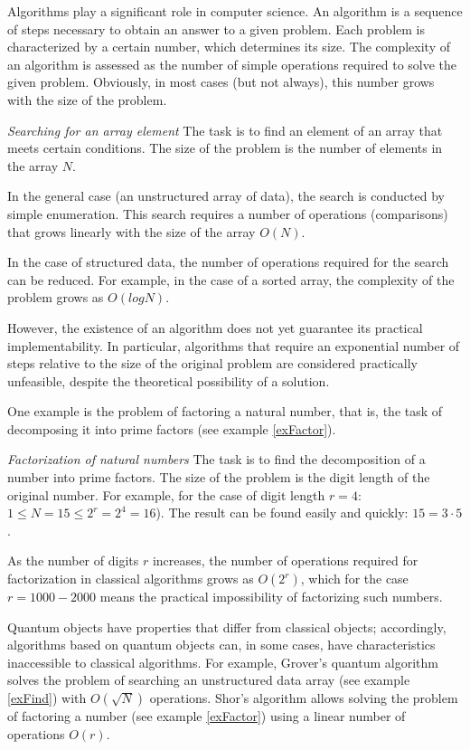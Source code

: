 Algorithms play a significant role in computer science. An algorithm is a sequence of steps necessary to obtain an answer to a given problem. Each problem is characterized by a certain number, which determines its size. The complexity of an algorithm is assessed as the number of simple operations required to solve the given problem. Obviously, in most cases (but not always), this number grows with the size of the problem.

\begin{example}
\emph{Searching for an array element}
\label{exFind}
The task is to find an element of an array that meets certain conditions. The size of the problem is the number of elements in the array $N$.

In the general case (an unstructured array of data), the search is conducted by simple enumeration. This search requires a number of operations (comparisons) that grows linearly with the size of the array $O\left( N \right)$.

In the case of structured data, the number of operations required for the search can be reduced. For example, in the case of a sorted array, the complexity of the problem grows as $O\left(log N\right)$.
\end{example}

However, the existence of an algorithm does not yet guarantee its practical implementability. In particular, algorithms that require an exponential number of steps relative to the size of the original problem are considered practically unfeasible, despite the theoretical possibility of a solution.

One example is the problem of factoring a natural number, that is, the task of decomposing it into prime factors (see example \ref{exFactor}).

\begin{example}
\emph{Factorization of natural numbers}
\label{exFactor}
The task is to find the decomposition of a number into prime factors. The size of the problem is the digit length of the original number. For example, for the case of digit length $r = 4$: $1 \le N = 15 \le 2^r = 2^4 = 16$). The result can be found easily and quickly: $15 = 3 \cdot 5$.

As the number of digits $r$ increases, the number of operations required for factorization in classical algorithms grows as $O\left(2^r\right)$, which for the case $r = 1000 - 2000$ means the practical impossibility of factorizing such numbers.
\end{example}

Quantum objects have properties that differ from classical objects; accordingly, algorithms based on quantum objects can, in some cases, have characteristics inaccessible to classical algorithms. For example, Grover's quantum algorithm \cite{Grover96afast} solves the problem of searching an unstructured data array (see example \ref{exFind}) with $O\left(\sqrt{N}\right)$ operations. Shor's algorithm \cite{bShor94} allows solving the problem of factoring a number (see example \ref{exFactor}) using a linear number of operations $O\left(r\right)$. 